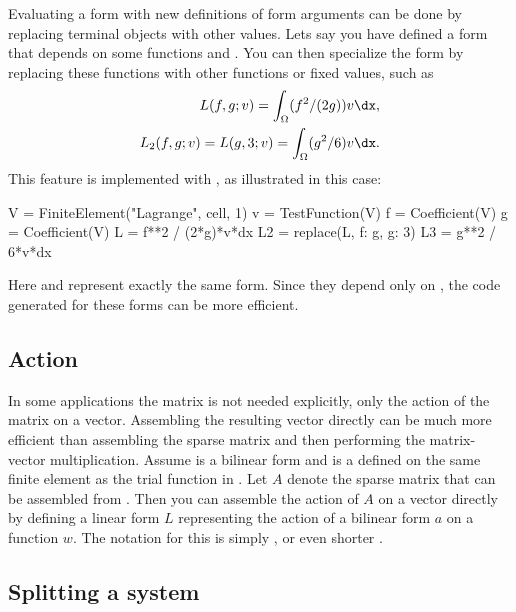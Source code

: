 Evaluating a form with new definitions of form arguments can be done
by replacing terminal objects with other values.  Lets say you have
defined a form  that depends on some functions  and .
You can then specialize the form by replacing these functions with other
functions or fixed values, such as
\begin{align}
L(f, g; v) = \int_\Omega (f^2 / (2g)) v \dx, \\
{L}_2(f, g; v) = L(g, 3; v) = \int_\Omega (g^2 / 6) v \dx.
\end{align}
This feature is implemented with , as illustrated in
this case:
\begin{uflcode}
V = FiniteElement("Lagrange", cell, 1)
v = TestFunction(V)
f = Coefficient(V)
g = Coefficient(V)
L = f**2 / (2*g)*v*dx
L2 = replace(L, { f: g, g: 3})
L3 = g**2 / 6*v*dx
\end{uflcode}
Here  and  represent exactly the same form. Since they
depend only on , the code generated for these forms can be more
efficient.

\subsection{Action}
\label{ufl:sec:action}

In some applications the matrix is not needed explicitly, only the action
of the matrix on a vector. Assembling the resulting vector directly can be
much more efficient than assembling the sparse matrix and then performing
the matrix-vector multiplication.  Assume  is a bilinear form and
 is a  defined on the same finite element as
the trial function in .  Let $A$ denote the sparse matrix that
can be assembled from . Then you can assemble the action of $A$
on a vector directly by defining a linear form $L$ representing the
action of a bilinear form $a$ on a function $w$.  The notation for this
is simply , or even shorter .
\subsection{Splitting a system}
\label{ufl:sec:system}

